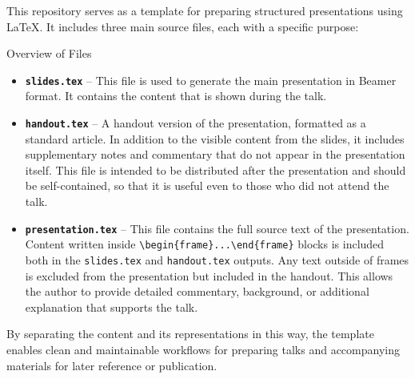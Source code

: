 This repository serves as a template for preparing structured presentations using \LaTeX. It includes three main source files, each with a specific purpose:

\begin{frame}[fragile]{Overview of Files}
\begin{itemize}
  \item \textbf{\texttt{slides.tex}} – This file is used to generate the main presentation in Beamer format. It contains the content that is shown during the talk.
  
  \item \textbf{\texttt{handout.tex}} – A handout version of the presentation, formatted as a standard article. In addition to the visible content from the slides, it includes supplementary notes and commentary that do not appear in the presentation itself. This file is intended to be distributed after the presentation and should be self-contained, so that it is useful even to those who did not attend the talk.
  
  \item \textbf{\texttt{presentation.tex}} – This file contains the full source text of the presentation. Content written inside \verb|\begin{frame}...\end{frame}| blocks is included both in the \texttt{slides.tex} and \texttt{handout.tex} outputs. Any text outside of frames is excluded from the presentation but included in the handout. This allows the author to provide detailed commentary, background, or additional explanation that supports the talk.
\end{itemize}
\end{frame}

By separating the content and its representations in this way, the template
enables clean and maintainable workflows for preparing talks and accompanying
materials for later reference or publication.
